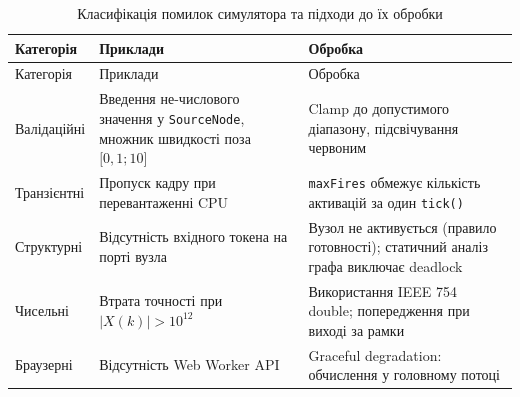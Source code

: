 \documentclass[
]{article}
\begin{document}
\begin{longtable}[]{@{}
  >{\raggedright\arraybackslash}p{}
  >{\raggedright\arraybackslash}p{}
  >{\raggedright\arraybackslash}p{}@{}}
\caption{Класифікація помилок симулятора та підходи до їх
обробки}\tabularnewline
\toprule\noalign{}
\begin{minipage}[b]{\linewidth}\raggedright
Категорія
\end{minipage} & \begin{minipage}[b]{\linewidth}\raggedright
Приклади
\end{minipage} & \begin{minipage}[b]{\linewidth}\raggedright
Обробка
\end{minipage} \\
\midrule\noalign{}
\endfirsthead
\toprule\noalign{}
\begin{minipage}[b]{\linewidth}\raggedright
Категорія
\end{minipage} & \begin{minipage}[b]{\linewidth}\raggedright
Приклади
\end{minipage} & \begin{minipage}[b]{\linewidth}\raggedright
Обробка
\end{minipage} \\
\midrule\noalign{}
\endhead
\bottomrule\noalign{}
\endlastfoot
Валідаційні & Введення не-числового значення у \texttt{SourceNode},
множник швидкості поза \(\lbrack 0,1;10\rbrack\) & Clamp до допустимого
діапазону, підсвічування червоним \\
Транзієнтні & Пропуск кадру при перевантаженні CPU & \texttt{maxFires}
обмежує кількість активацій за один \texttt{tick}\texttt{()} \\
Структурні & Відсутність вхідного токена на порті вузла & Вузол не
активується (правило готовності); статичний аналіз графа виключає
deadlock \\
Чисельні & Втрата точності при \(|X(k)| > 10^{12}\) & Використання IEEE
754 double; попередження при виході за рамки \\
Браузерні & Відсутність Web Worker API & Graceful degradation:
обчислення у головному потоці \\
\end{longtable}
\end{document}
